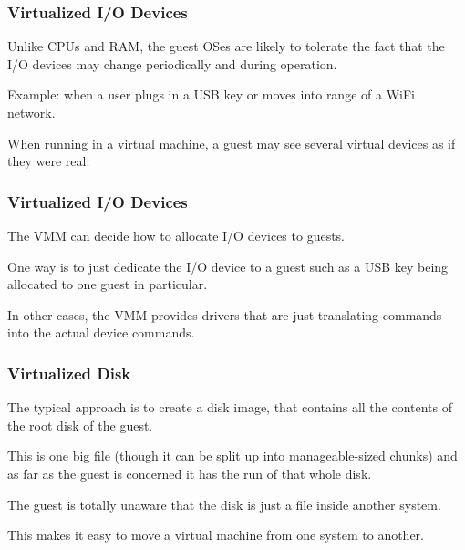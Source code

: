 \begin{frame}
\frametitle{Virtualized I/O Devices}

Unlike CPUs and RAM, the guest OSes are likely to tolerate the fact that the I/O devices may change periodically and during operation.

Example: when a user plugs in a USB key or moves into range of a WiFi network. 

When running in a virtual machine, a guest may see several virtual devices as if they were real.


\end{frame}

\begin{frame}
\frametitle{Virtualized I/O Devices}

The VMM can decide how to allocate I/O devices to guests. 

One way is to just dedicate the I/O device to a guest such as a USB key being allocated to one guest in particular. 

In other cases, the VMM provides drivers that are just translating commands into the actual device commands. 

\end{frame}

\begin{frame}
\frametitle{Virtualized Disk}

The typical approach is to create a \alert{disk image}, that contains all the contents of the root disk of the guest. 

This is one big file (though it can be split up into manageable-sized chunks) and as far as the guest is concerned it has the run of that whole disk.

The guest is totally unaware that the disk is just a file inside another system. 

This makes it easy to move a virtual machine from one system to another.
\end{frame}




